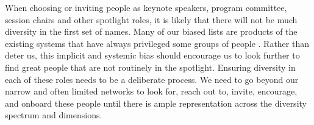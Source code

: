 \documentclass[10pt,letterpaper]{article}
\begin{document}
When choosing or inviting people as keynote speakers, program committee, session chairs and other spotlight roles, it is likely that there will not be much diversity in the first set of names. Many of our biased lists are products of the existing systems that have always privileged some groups of people \cite{dwyerNoticeWhoScience2021,swartzScienceValueDiversity2019,wongBuildDiversityScience2020,dignazioUnicornsJanitorsNinjas2020}. Rather than deter us, this implicit and systemic bias should encourage us to look further to find great people that are not routinely in the spotlight. 
Ensuring diversity in each of these roles needs to be a deliberate process. We need to go beyond our narrow and often limited networks to look for, reach out to, invite, encourage, and onboard these people until there is ample representation across the diversity spectrum and dimensions. 
\end{document}
